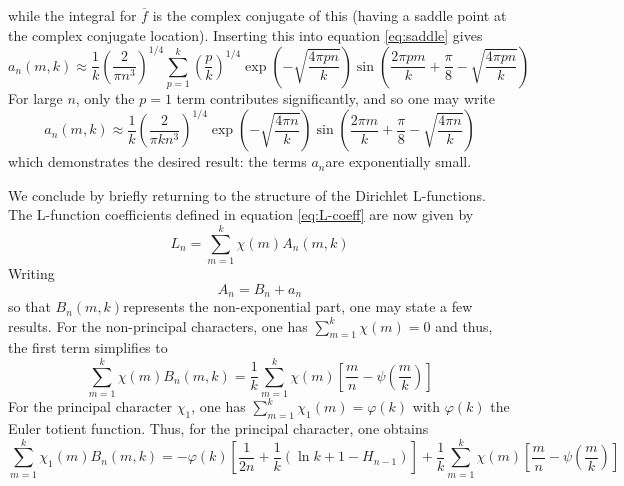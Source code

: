 \documentclass{amsart}
\begin{document}
 while the integral for $\overline{f}$ is the complex conjugate of
this (having a saddle point at the complex conjugate location). Inserting
this into equation \ref{eq:saddle} gives \begin{equation}
a_{n}(m,k)\approx\frac{1}{k}\left(\frac{2}{\pi n^{3}}\right)^{1/4}\sum_{p=1}^{k}\left(\frac{p}{k}\right)^{1/4}\exp\left(-\sqrt{\frac{4\pi pn}{k}}\right)\sin\left(\frac{2\pi pm}{k}+\frac{\pi}{8}-\sqrt{\frac{4\pi pn}{k}}\right)\label{eq:an-p}\end{equation}
For large $n$, only the $p=1$ term contributes significantly, and
so one may write\begin{equation}
a_{n}(m,k)\approx\frac{1}{k}\left(\frac{2}{\pi kn^{3}}\right)^{1/4}\exp\left(-\sqrt{\frac{4\pi n}{k}}\right)\sin\left(\frac{2\pi m}{k}+\frac{\pi}{8}-\sqrt{\frac{4\pi n}{k}}\right)\label{eq:}\end{equation}
 which demonstrates the desired result: the terms $a_{n}$are exponentially
small.



We conclude by briefly returning to the structure of the Dirichlet
L-functions. The L-function coefficients defined in equation \ref{eq:L-coeff}
are now given by \begin{equation}
L_{n}=\sum_{m=1}^{k}\chi(m)A_{n}(m,k)\label{eq:}\end{equation}
 Writing \begin{equation}
A_{n}=B_{n}+a_{n}\label{eq:}\end{equation}
 so that $B_{n}(m,k)$represents the non-exponential part, one may
state a few results. For the non-principal characters, one has $\sum_{m=1}^{k}\chi(m)=0$
and thus, the first term simplifies to \begin{equation}
\sum_{m=1}^{k}\chi(m)B_{n}(m,k)=\frac{1}{k}\sum_{m=1}^{k}\chi(m)\left[\frac{m}{n}-\psi\left(\frac{m}{k}\right)\right]\label{eq:}\end{equation}
 For the principal character $\chi_{1}$, one has $\sum_{m=1}^{k}\chi_{1}(m)=\varphi(k)$
with $\varphi(k)$ the Euler totient function. Thus, for the principal
character, one obtains \begin{equation}
\sum_{m=1}^{k}\chi_{1}(m)B_{n}(m,k)=-\varphi(k)\left[\frac{1}{2n}+\frac{1}{k}\left(\ln k+1-H_{n-1}\right)\right]+\frac{1}{k}\sum_{m=1}^{k}\chi(m)\left[\frac{m}{n}-\psi\left(\frac{m}{k}\right)\right]\label{eq:}\end{equation}
\end{document}
